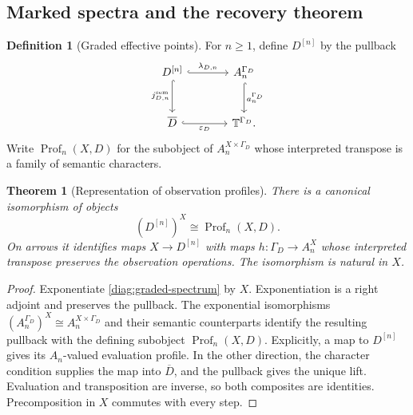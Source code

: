 \documentclass[11pt,a4paper]{article}
\numberwithin{equation}{section}
\newtheorem{theorem}{Theorem}[section]
\theoremstyle{definition}
\newtheorem{definition}[definition]{Definition}
\theoremstyle{remark}
\theoremstyle{plain}
\newcommand{\TV}{\mathbb T}
\newcommand{\jsem}{j^{\mathrm{sem}}}
\newcommand{\Profile}{\operatorname{Prof}}
\begin{document}
\subsection{Marked spectra and the recovery theorem}

\begin{definition}[Graded effective points]
\label{def:descriptive-spectrum}
For $n\geq1$, define $D^{[n]}$ by the pullback
\begin{equation}\label{diag:graded-spectrum}
\begin{tikzcd}[column sep=large,row sep=large]
 D^{[n]}\ar[r,hook,"\lambda_{D,n}"]\ar[d,hook,"\jsem_{D,n}"']&
 A_n^{\Gamma_D}\ar[d,hook,"a_n^{\Gamma_D}"]\\
 \overline D\ar[r,hook,"\varepsilon_D"']&\TV^{\Gamma_D}.
\end{tikzcd}
\end{equation}
Write $\Profile_n(X,D)$ for the subobject of $A_n^{X\times\Gamma_D}$
whose interpreted transpose is a family of semantic characters.
\end{definition}

\begin{theorem}[Representation of observation profiles]
\label{thm:profile-representation}
There is a canonical isomorphism of objects
\begin{equation}\label{eq:profile-object}
 (D^{[n]})^X\cong\Profile_n(X,D).
\end{equation}
On arrows it identifies maps $X\to D^{[n]}$ with maps
$h:\Gamma_D\to A_n^X$ whose interpreted transpose preserves the
observation operations. The isomorphism is natural in $X$.
\end{theorem}
\begin{proof}
Exponentiate \eqref{diag:graded-spectrum} by $X$. Exponentiation is a
right adjoint and preserves the pullback. The exponential isomorphisms
$(A_n^{\Gamma_D})^X\cong A_n^{X\times\Gamma_D}$ and their semantic
counterparts identify the resulting pullback with the defining
subobject $\Profile_n(X,D)$. Explicitly, a map to $D^{[n]}$ gives its
$A_n$-valued evaluation profile. In the other direction, the character
condition supplies the map into $\overline D$, and the pullback gives
the unique lift. Evaluation and transposition are inverse, so both
composites are identities. Precomposition in $X$ commutes with every
step.
\end{proof}
\end{document}
